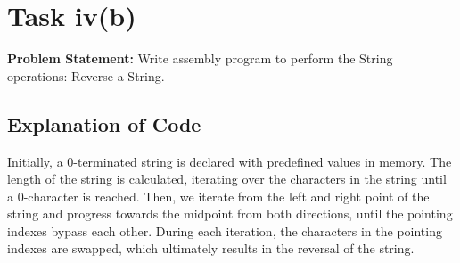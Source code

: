 \documentclass[footheight=20pt, footsepline, headheight=20pt, headsepline]{scrartcl}
\begin{document}
\FloatBarrier
{}
\section*{Task iv(b)}
\textbf{Problem Statement:} Write assembly program to perform the String operations: Reverse a String.
\subsection*{Explanation of Code}
Initially, a 0-terminated string is declared with predefined values in memory. The length of the string is calculated, iterating over the characters in the string until a 0-character is reached. Then, we iterate from the left and right point of the string and progress towards the midpoint from both directions, until the pointing indexes bypass each other. During each iteration, the characters in the pointing indexes are swapped, which ultimately results in the reversal of the string.
\end{document}
